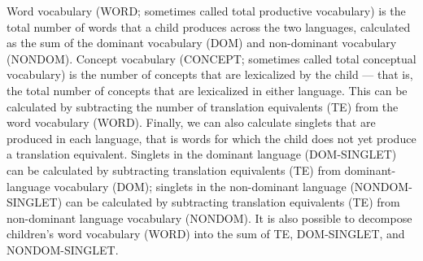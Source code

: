 \documentclass[
  english,
  ,man,floatsintext]{apa6}
\begin{document}
Word vocabulary (WORD; sometimes called total productive vocabulary) is the total number of words that a child produces across the two languages, calculated as the sum of the dominant vocabulary (DOM) and non-dominant vocabulary (NONDOM).
Concept vocabulary (CONCEPT; sometimes called total conceptual vocabulary) is the number of concepts that are lexicalized by the child --- that is, the total number of concepts that are lexicalized in either language. This can be calculated by subtracting the number of translation equivalents (TE) from the word vocabulary (WORD). Finally, we can also calculate singlets that are produced in each language, that is words for which the child does not yet produce a translation equivalent. Singlets in the dominant language (DOM-SINGLET) can be calculated by subtracting translation equivalents (TE) from dominant-language vocabulary (DOM); singlets in the non-dominant language (NONDOM-SINGLET) can be calculated by subtracting translation equivalents (TE) from non-dominant language vocabulary (NONDOM). It is also possible to decompose children's word vocabulary (WORD) into the sum of TE, DOM-SINGLET, and NONDOM-SINGLET.
\end{document}
